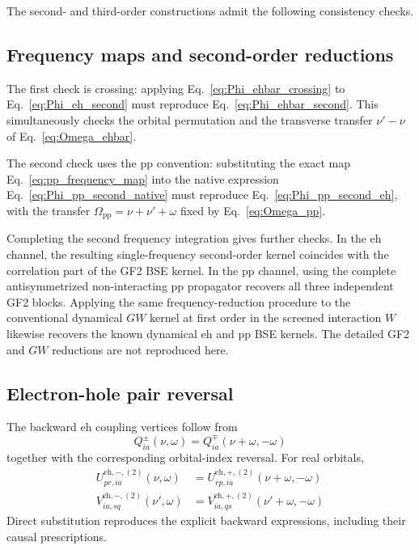 \documentclass[aip,jcp,reprint,noshowkeys,superscriptaddress]{revtex4-1}
\newcommand{\eh}{\text{eh}}
\newcommand{\pp}{\text{pp}}
\begin{document}
The second- and third-order constructions admit the following consistency checks.
\subsection{Frequency maps and second-order reductions}
The first check is crossing: applying
Eq.~\eqref{eq:Phi_ehbar_crossing} to
Eq.~\eqref{eq:Phi_eh_second} must reproduce
Eq.~\eqref{eq:Phi_ehbar_second}.
This simultaneously checks the orbital permutation and the transverse
transfer $\nu'-\nu$ of Eq.~\eqref{eq:Omega_ehbar}.

The second check uses the $\pp$ convention: substituting the exact map
Eq.~\eqref{eq:pp_frequency_map} into the native expression
Eq.~\eqref{eq:Phi_pp_second_native} must reproduce
Eq.~\eqref{eq:Phi_pp_second_eh}, with the transfer
$\Omega_\pp=\nu+\nu'+\omega$ fixed by Eq.~\eqref{eq:Omega_pp}.

Completing the second frequency integration gives further checks.
In the $\eh$ channel, the resulting single-frequency second-order kernel
coincides with the correlation part of the GF2 BSE kernel.
In the $\pp$ channel, using the complete antisymmetrized non-interacting
$\pp$ propagator recovers all three independent GF2 blocks.\cite{MarieRomanielloBlaseLoos2025}
Applying the same frequency-reduction procedure to the conventional dynamical
$GW$ kernel at first order in the screened interaction $W$ likewise recovers
the known dynamical $\eh$ and $\pp$ BSE kernels.\cite{MarieAmmarLoos2024,MarieRomanielloLoos2024,MarieRomanielloBlaseLoos2025}
The detailed GF2 and $GW$ reductions are not reproduced here.


\subsection{Electron-hole pair reversal}

The backward $\eh$ coupling vertices follow from
\begin{equation}
    Q^{\pm}_{ia}(\nu,\omega)
    =Q^{\mp}_{ia}(\nu+\omega,-\omega)
    \label{eq:Q_reversal_third}
\end{equation}
together with the corresponding orbital-index reversal.
For real orbitals,
\begin{align}
    U^{\eh,-,(2)}_{pr,ia}(\nu,\omega)
    &=
    U^{\eh,+,(2)}_{rp,ia}(\nu+\omega,-\omega)
    \label{eq:U_eh_pair_reversal}
    \\
    V^{\eh,-,(2)}_{ia,sq}(\nu',\omega)
    &=
    V^{\eh,+,(2)}_{ia,qs}(\nu'+\omega,-\omega)
    \label{eq:V_eh_pair_reversal}
\end{align}
Direct substitution reproduces the explicit backward expressions, including
their causal prescriptions.
\end{document}
